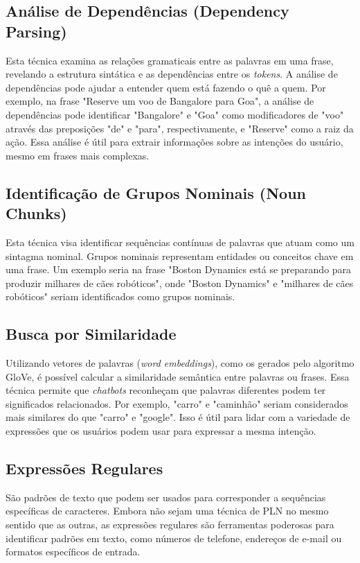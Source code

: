 \documentclass[14pt,a4paper,oneside]{book}
\begin{document}
\subsection{Análise de Dependências (Dependency Parsing)}
Esta técnica examina as relações gramaticais entre as palavras em uma frase, revelando a estrutura sintática e as dependências entre os \textit{tokens}. A análise de dependências pode ajudar a entender quem está fazendo o quê a quem. Por exemplo, na frase "Reserve um voo de Bangalore para Goa", a análise de dependências pode identificar "Bangalore" e "Goa" como modificadores de "voo" através das preposições "de" e "para", respectivamente, e "Reserve" como a raiz da ação. Essa análise é útil para extrair informações sobre as intenções do usuário, mesmo em frases mais complexas.

\subsection{Identificação de Grupos Nominais (Noun Chunks)}
Esta técnica visa identificar sequências contínuas de palavras que atuam como um sintagma nominal. Grupos nominais representam entidades ou conceitos chave em uma frase. Um exemplo seria na frase "Boston Dynamics está se preparando para produzir milhares de cães robóticos", onde "Boston Dynamics" e "milhares de cães robóticos" seriam identificados como grupos nominais.

\subsection{Busca por Similaridade}
Utilizando vetores de palavras (\textit{word embeddings}), como os gerados pelo algoritmo GloVe, é possível calcular a similaridade semântica entre palavras ou frases. Essa técnica permite que \textit{chatbots} reconheçam que palavras diferentes podem ter significados relacionados. Por exemplo, "carro" e "caminhão" seriam considerados mais similares do que "carro" e "google". Isso é útil para lidar com a variedade de expressões que os usuários podem usar para expressar a mesma intenção.

\subsection{Expressões Regulares}
São padrões de texto que podem ser usados para corresponder a sequências específicas de caracteres. Embora não sejam uma técnica de PLN no mesmo sentido que as outras, as expressões regulares são ferramentas poderosas para identificar padrões em texto, como números de telefone, endereços de e-mail ou formatos específicos de entrada.
\end{document}
